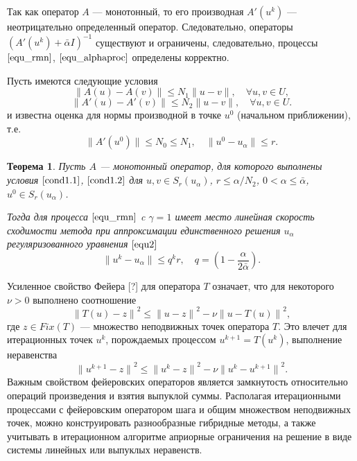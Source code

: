 \documentclass[%
autoref,     %
href,        %
facsimile,   %
colorlinks,  %
]{disser}
\newtheorem{theorem}{Теорема}[chapter]
\begin{document}
Так как оператор $A$ --- монотонный, то его производная $A'(u^k)$ --- неотрицательно определенный оператор. Следовательно, операторы $(A'(u^k)+\bar\alpha I)^{-1}$ существуют и ограничены, следовательно, процессы $\eqref{equ_rmn}$, $\eqref{equ_alphaproc}$ определены корректно.
\scriptsize
\let\thefootnote\relax\let\thefootnote\relax{}

Пусть имеются следующие условия
\begin{equation}\label{cond1.1}
\|A(u)-A(v)\|\le N_1\|u-v\|, \quad \forall u, v \in U,
\end{equation}
\begin{equation}\label{cond1.2}
\|A'(u)-A'(v)\|\le N_2\|u-v\|, \quad \forall u, v \in U.
\end{equation}
и известна оценка для нормы производной в точке $u^0$ (начальном приближении), т.е.
\begin{equation}\label{cond1.3}
\|A'(u^0)\| \le N_0\le N_1, \quad \|u^0-u_\alpha\| \le r.
\end{equation}

\begin{theorem}\label{teo2.1} Пусть $A$ --- монотонный оператор, для которого выполнены условия $\eqref{cond1.1}$, $\eqref{cond1.2}$ для $u, v \in S_r(u_\alpha)$, $r\le \alpha/N_2$, $0<\alpha \le \bar\alpha$, $u^0 \in S_r(u_\alpha)$. 
	
	Тогда для процесса $\eqref{equ_rmn}$ c $\gamma=1$ имеет место линейная скорость сходимости метода при аппроксимации единственного решения $u_\alpha$ регуляризованного уравнения $\eqref{equ2}$
	\begin{equation}\label{nwt_conv}
	\| u^k-u_\alpha \| \le q^kr, \quad q=(1-\frac{\alpha}{2\bar\alpha}).
	\end{equation}
\end{theorem}

Усиленное свойство Фейера [?] для оператора $T$ означает, что для некоторого $\nu>0$ выполнено соотношение
\begin{equation}\label{fejer_prop_uni}
{\|T(u)-z\|}^2\le{\|u-z\|}^2-\nu{\|u-T(u)\|}^2,
\end{equation}
где $z\in Fix(T)$ --- множество неподвижных точек оператора $T$. Это влечет для итерационных точек $u^k$, порождаемых процессом $u^{k+1}=T(u^k)$, выполнение неравенства
\begin{equation}\label{fejer_prop_it}
{\|u^{k+1}-z\|}^2\le{\|u^k-z\|}^2-\nu{\|u^k-u^{k+1}\|}^2.
\end{equation}
\scriptsize
\let\thefootnote\relax\let\thefootnote\relax{}
Важным свойством фейеровских операторов является замкнутость относительно операций произведения и взятия выпуклой суммы. Располагая итерационными процессами с фейеровским оператором шага и общим множеством неподвижных точек, можно конструировать разнообразные гибридные методы, а также учитывать в итерационном алгоритме априорные ограничения на решение в виде системы линейных или выпуклых неравенств.
\end{document}
